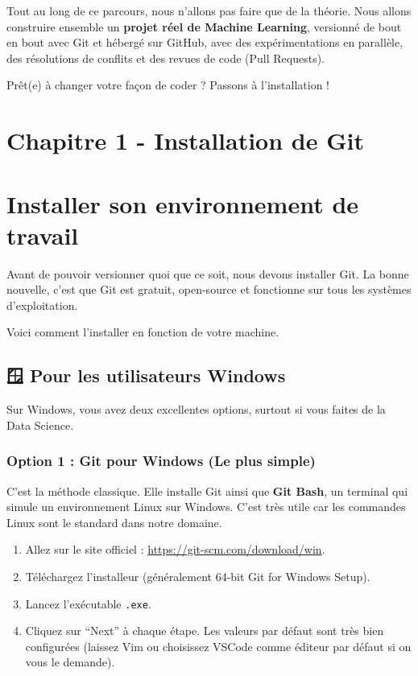 \documentclass[
  letterpaper,
  DIV=11,
  numbers=noendperiod]{scrreprt}
\providecommand{\tightlist}{%
  \setlength{\itemsep}{0pt}\setlength{\parskip}{0pt}}
\begin{document}
Tout au long de ce parcours, nous n'allons pas faire que de la théorie.
Nous allons construire ensemble un \textbf{projet réel de Machine
Learning}, versionné de bout en bout avec Git et hébergé sur GitHub,
avec des expérimentations en parallèle, des résolutions de conflits et
des revues de code (Pull Requests).

Prêt(e) à changer votre façon de coder ? Passons à l'installation ! 🚀


\section{Chapitre 1 - Installation de
Git}\label{chapitre-1---installation-de-git}


\section{Installer son environnement de
travail}\label{installer-son-environnement-de-travail}

Avant de pouvoir versionner quoi que ce soit, nous devons installer Git.
La bonne nouvelle, c'est que Git est gratuit, open-source et fonctionne
sur tous les systèmes d'exploitation.

Voici comment l'installer en fonction de votre machine.

\subsection{🪟 Pour les utilisateurs
Windows}\label{pour-les-utilisateurs-windows}

Sur Windows, vous avez deux excellentes options, surtout si vous faites
de la Data Science.

\subsubsection{Option 1 : Git pour Windows (Le plus
simple)}\label{option-1-git-pour-windows-le-plus-simple}

C'est la méthode classique. Elle installe Git ainsi que \textbf{Git
Bash}, un terminal qui simule un environnement Linux sur Windows. C'est
très utile car les commandes Linux sont le standard dans notre domaine.

\begin{enumerate}
\def\labelenumi{\arabic{enumi}.}
\tightlist
\item
  Allez sur le site officiel : \url{https://git-scm.com/download/win}.
\item
  Téléchargez l'installeur (généralement 64-bit Git for Windows Setup).
\item
  Lancez l'exécutable \texttt{.exe}.
\item
  Cliquez sur ``Next'' à chaque étape. Les valeurs par défaut sont très
  bien configurées (laissez Vim ou choisissez VSCode comme éditeur par
  défaut si on vous le demande).
\end{enumerate}
\end{document}
